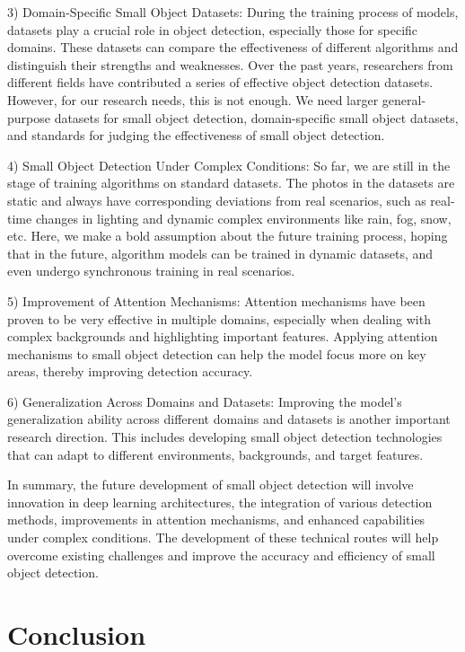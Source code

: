 \documentclass[journal]{IEEEtran}
\begin{document}
  3) Domain-Specific Small Object Datasets: During the training process of models, datasets play a crucial role in object detection, especially those for specific domains. These datasets can compare the effectiveness of different algorithms and distinguish their strengths and weaknesses. Over the past years, researchers from different fields have contributed a series of effective object detection datasets. However, for our research needs, this is not enough. We need larger general-purpose datasets for small object detection, domain-specific small object datasets, and standards for judging the effectiveness of small object detection.

  4) Small Object Detection Under Complex Conditions: So far, we are still in the stage of training algorithms on standard datasets. The photos in the datasets are static and always have corresponding deviations from real scenarios, such as real-time changes in lighting and dynamic complex environments like rain, fog, snow, etc. Here, we make a bold assumption about the future training process, hoping that in the future, algorithm models can be trained in dynamic datasets, and even undergo synchronous training in real scenarios.

  5) Improvement of Attention Mechanisms: Attention mechanisms have been proven to be very effective in multiple domains, especially when dealing with complex backgrounds and highlighting important features. Applying attention mechanisms to small object detection can help the model focus more on key areas, thereby improving detection accuracy.

  6) Generalization Across Domains and Datasets: Improving the model’s generalization ability across different domains and datasets is another important research direction. This includes developing small object detection technologies that can adapt to different environments, backgrounds, and target features.
  
In summary, the future development of small object detection will involve innovation in deep learning architectures, the integration of various detection methods, improvements in attention mechanisms, and enhanced capabilities under complex conditions. The development of these technical routes will help overcome existing challenges and improve the accuracy and efficiency of small object detection.

\section{Conclusion}
\end{document}
